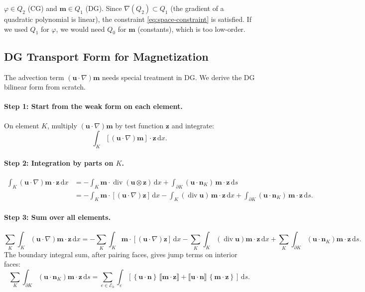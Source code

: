 \documentclass[11pt,a4paper]{article}
\theoremstyle{definition}
\theoremstyle{remark}
\newcommand{\dd}{\,\mathrm{d}}
\newcommand{\dv}{\operatorname{div}}
\newcommand{\grad}{\nabla}
\newcommand{\jump}[1]{\llbracket #1 \rrbracket}
\newcommand{\avg}[1]{\left\{ #1 \right\}}
\newcommand{\bfu}{\bm{u}}
\newcommand{\bfm}{\bm{m}}
\newcommand{\bfn}{\bm{n}}
\newcommand{\bfz}{\bm{z}}
\newcommand{\Eh}{\mathcal{E}_h}
\begin{document}
\begin{keypoint}
$\varphi \in Q_2$ (CG) and $\bfm \in Q_1$ (DG). Since
$\grad(Q_2) \subset Q_1$ (the gradient of a quadratic polynomial is
linear), the constraint \eqref{eq:space-constraint} is satisfied.
If we used $Q_1$ for $\varphi$, we would need $Q_0$ for $\bfm$ (constants),
which is too low-order.
\end{keypoint}

\subsection{DG Transport Form for Magnetization}
\label{sec:dg-transport}

The advection term $(\bfu\cdot\grad)\bfm$ needs special treatment in
DG. We derive the DG bilinear form from scratch.

\paragraph{Step 1: Start from the weak form on each element.}
On element $K$, multiply $(\bfu\cdot\grad)\bfm$ by test function $\bfz$
and integrate:
\[
  \int_K [(\bfu\cdot\grad)\bfm] \cdot \bfz \dd x.
\]

\paragraph{Step 2: Integration by parts on $K$.}
\begin{align*}
  \int_K (\bfu\cdot\grad)\bfm \cdot \bfz \dd x
  &= -\int_K \bfm \cdot \dv(\bfu \otimes \bfz) \dd x
     + \int_{\partial K} (\bfu \cdot \bfn_K)\,\bfm \cdot \bfz \dd s \\
  &= -\int_K \bfm \cdot [(\bfu\cdot\grad)\bfz] \dd x
     - \int_K (\dv\bfu)\,\bfm \cdot \bfz \dd x
     + \int_{\partial K} (\bfu\cdot\bfn_K)\,\bfm \cdot \bfz \dd s.
\end{align*}

\paragraph{Step 3: Sum over all elements.}
\[
  \sum_K \int_K (\bfu\cdot\grad)\bfm\cdot\bfz \dd x
  = -\sum_K \int_K \bfm \cdot [(\bfu\cdot\grad)\bfz] \dd x
    - \sum_K \int_K (\dv\bfu)\bfm\cdot\bfz \dd x
    + \sum_K \int_{\partial K} (\bfu\cdot\bfn_K)\bfm\cdot\bfz \dd s.
\]
The boundary integral sum, after pairing faces, gives jump terms on
interior faces:
\[
  \sum_K \int_{\partial K} (\bfu\cdot\bfn_K)\bfm\cdot\bfz \dd s
  = \sum_{e \in \Eh} \int_e \left[
    \avg{\bfu\cdot\bfn}\,\jump{\bfm\cdot\bfz}
    + \jump{\bfu\cdot\bfn}\,\avg{\bfm\cdot\bfz}
  \right] \dd s.
\]
\end{document}
